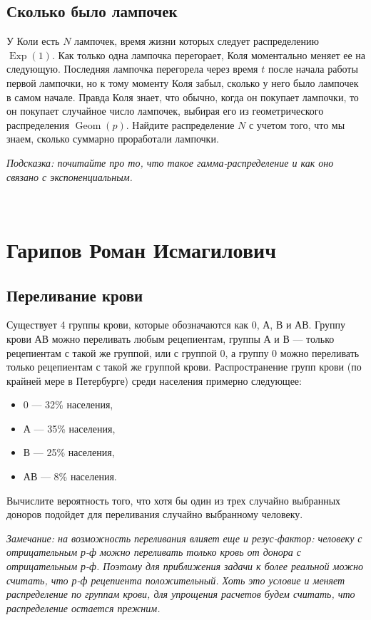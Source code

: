\documentclass[12pt]{article}
\DeclareMathOperator{\Geom}{Geom}
\DeclareMathOperator{\Exp}{Exp}
\begin{document}
\subsection{Сколько было лампочек}
У Коли есть $N$ лампочек, время жизни которых следует распределению $\Exp(1)$. Как только одна лампочка перегорает, Коля моментально меняет ее на следующую. Последняя лампочка перегорела через время $t$ после начала работы первой лампочки, но к тому моменту Коля забыл, сколько у него было лампочек в самом начале. Правда Коля знает, что обычно, когда он покупает лампочки, то он покупает случайное число лампочек, выбирая его из геометрического распределения $\Geom(p)$. Найдите распределение $N$ с учетом того, что мы знаем, сколько суммарно проработали лампочки. 

\emph{Подсказка: почитайте про то, что такое гамма-распределение и как оно связано с экспоненциальным.}

\newpage
~
\newpage
\section{Гарипов Роман Исмагилович}

\subsection{Переливание крови}
Существует 4 группы крови, которые обозначаются как 0, А, В и АВ. Группу крови АВ можно переливать любым рецепиентам, группы А и В --- только рецепиентам с такой же группой, или с группой 0, а группу 0 можно переливать только рецепиентам с такой же группой крови. Распространение групп крови (по крайней мере в Петербурге) среди населения примерно следующее:
\begin{itemize}
    \item 0 --- 32\% населения,
    \item А --- 35\% населения,
    \item В --- 25\% населения,
    \item АВ --- 8\% населения.
\end{itemize}
Вычислите вероятность того, что хотя бы один из трех случайно выбранных доноров подойдет для переливания случайно выбранному человеку. 

\emph{Замечание: на возможность переливания влияет еще и резус-фактор: человеку с отрицательным р-ф можно переливать только кровь от донора с отрицательным р-ф. Поэтому для приближения задачи к более реальной можно считать, что р-ф рецепиента положительный. Хоть это условие и меняет распределение по группам крови, для упрощения расчетов будем считать, что распределение остается прежним.}
\end{document}
